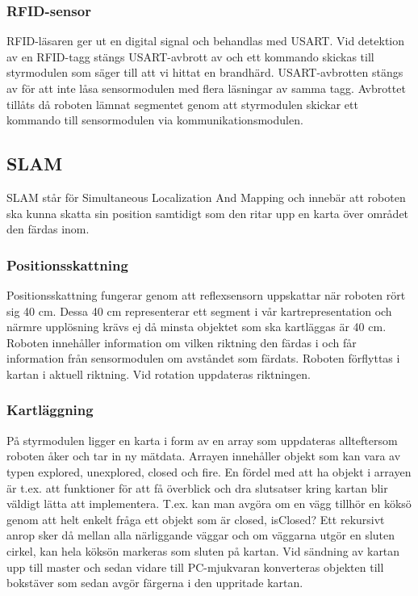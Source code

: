 \documentclass[a4paper,12pt,fleqn]{article}
\begin{document}
\subsubsection{RFID-sensor}

RFID-läsaren ger ut en digital signal och behandlas med USART. Vid detektion av en RFID-tagg stängs USART-avbrott av och ett kommando skickas till styrmodulen som säger till att vi hittat en brandhärd. 
USART-avbrotten stängs av för att inte låsa sensormodulen med flera läsningar av samma tagg. Avbrottet tillåts då roboten lämnat segmentet genom att styrmodulen skickar ett kommando till sensormodulen via kommunikationsmodulen.

\subsection{SLAM}

SLAM står för Simultaneous Localization And Mapping och innebär att roboten ska kunna skatta sin position samtidigt som den ritar upp en karta över området den färdas inom.

\subsubsection{Positionsskattning}
Positionsskattning fungerar genom att reflexsensorn uppskattar när roboten rört sig 40 cm. Dessa 40 cm representerar ett segment i vår kartrepresentation och närmre upplösning krävs ej då minsta objektet som ska kartläggas är 40 cm. Roboten innehåller information om vilken riktning den färdas i och får information från sensormodulen om avståndet som färdats. Roboten förflyttas i kartan i aktuell riktning. Vid rotation uppdateras riktningen. 

\subsubsection{Kartläggning}
På styrmodulen ligger en karta i form av en array som uppdateras allteftersom roboten åker och tar in ny mätdata. Arrayen innehåller objekt som kan vara av typen explored, unexplored, closed och fire. En fördel med att ha objekt i arrayen är t.ex. att funktioner för att få överblick och dra slutsatser kring kartan blir väldigt lätta att implementera. T.ex. kan man avgöra om en vägg tillhör en köksö genom att helt enkelt fråga ett objekt som är closed, isClosed? Ett rekursivt anrop sker då mellan alla närliggande väggar och om väggarna utgör en sluten cirkel, kan hela köksön markeras som sluten på kartan. 
Vid sändning av kartan upp till master och sedan vidare till PC-mjukvaran konverteras objekten till bokstäver som sedan avgör färgerna i den uppritade kartan.
\end{document}
